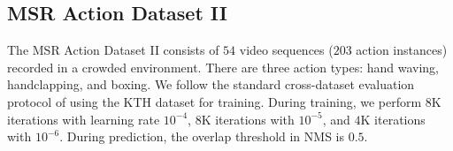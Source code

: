 \documentclass[10pt,twocolumn,letterpaper]{article}
\begin{document}
\begin{table}[t]
	\begin{minipage}{0.25\textwidth}%
		\centering
	\end{minipage}%
	\begin{minipage}{0.25\textwidth}%
		\centering
	\end{minipage}%
	\caption{Action detection results on MSR Action Dataset II and MPII Cooking dataset. Our approach consistently achieves better performance compared to state-of-the-art approaches at $0.5$ overlap threshold.\label{tab:MSRAndMEX}}%
\end{table} 

\subsection{MSR Action Dataset II}
The MSR Action Dataset II \cite{MSR_action_II_PAMI11} consists of $54$ video sequences ($203$ action instances) recorded in a crowded environment. There are three action types: hand waving, handclapping, and boxing. We follow the standard cross-dataset evaluation protocol of using the KTH dataset for training.  During training, we perform $8$K iterations with learning rate $10^{-4}$, $8$K iterations with $10^{-5}$, and $4$K iterations with $10^{-6}$. During prediction, the overlap threshold in NMS is $0.5$.
\end{document}
